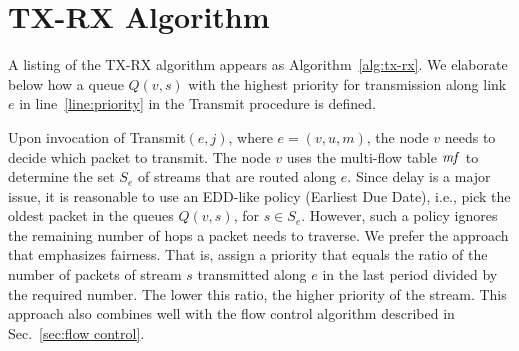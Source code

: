 \documentclass[12pt]{article}
\newenvironment{proof sketch}[1]{\noindent {\emph{Proof sketch of #1:}}}{\hfill \qed}
\newcommand{\mf}{\text{\emph{mf}}}
\begin{document}
\section{TX-RX Algorithm} \label{sec:algs}
A listing of the TX-RX algorithm appears as Algorithm~\ref{alg:tx-rx}.
We elaborate below how a queue $Q(v,s)$ with the highest priority for
transmission along link $e$ in line~\ref{line:priority} in the
Transmit procedure is defined.

Upon invocation of Transmit$(e,j)$, where $e=(v,u,m)$, the node $v$
needs to decide which packet to transmit. The node $v$ uses the
multi-flow table $\mf$ to determine the set $S_e$ of streams that are
routed along $e$.  Since delay is a major issue, it is reasonable to
use an EDD-like policy (Earliest Due Date), i.e., pick the oldest packet in the queues
$Q(v,s)$, for $s\in S_e$.  However, such a policy ignores the
remaining number of hops a packet needs to traverse. We prefer the
approach that emphasizes fairness. That is, assign a priority that
equals the ratio of the number of packets of stream $s$ transmitted
along $e$ in the last period divided by the required number. The lower
this ratio, the higher priority of the stream. This approach also
combines well with the flow control algorithm described in
Sec.~\ref{sec:flow control}.
\end{document}
